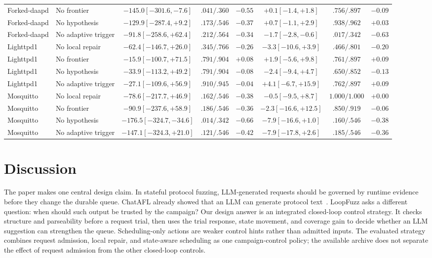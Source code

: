 \documentclass[final,5p,times,number]{elsarticle}
\begin{document}
\begin{table}[!t]
{{\begin{tabular}{l l c c c c c c}
Forked-daapd & No frontier & $-145.0 [-301.6,-7.6]$ & $.041/.360$ & $-0.55$ & $+0.1 [-1.4,+1.8]$ & $.756/.897$ & $-0.09$ \\
Forked-daapd & No hypothesis & $-129.9 [-287.4,+9.2]$ & $.173/.546$ & $-0.37$ & $+0.7 [-1.1,+2.9]$ & $.938/.962$ & $+0.03$ \\
Forked-daapd & No adaptive trigger & $-91.8 [-258.6,+62.4]$ & $.212/.564$ & $-0.34$ & $-1.7 [-2.8,-0.6]$ & $.017/.342$ & $-0.63$ \\
Lighttpd1 & No local repair & $-62.4 [-146.7,+26.0]$ & $.345/.766$ & $-0.26$ & $-3.3 [-10.6,+3.9]$ & $.466/.801$ & $-0.20$ \\
Lighttpd1 & No frontier & $-15.9 [-100.7,+71.5]$ & $.791/.904$ & $+0.08$ & $+1.9 [-5.6,+9.8]$ & $.761/.897$ & $+0.09$ \\
Lighttpd1 & No hypothesis & $-33.9 [-113.2,+49.2]$ & $.791/.904$ & $-0.08$ & $-2.4 [-9.4,+4.7]$ & $.650/.852$ & $-0.13$ \\
Lighttpd1 & No adaptive trigger & $-27.1 [-109.6,+56.9]$ & $.910/.945$ & $-0.04$ & $+4.1 [-6.7,+15.9]$ & $.762/.897$ & $+0.09$ \\
Mosquitto & No local repair & $-78.6 [-217.7,+46.9]$ & $.162/.546$ & $-0.38$ & $-0.5 [-9.5,+8.7]$ & $1.000/1.000$ & $+0.00$ \\
Mosquitto & No frontier & $-90.9 [-237.6,+58.9]$ & $.186/.546$ & $-0.36$ & $-2.3 [-16.6,+12.5]$ & $.850/.919$ & $-0.06$ \\
Mosquitto & No hypothesis & $-176.5 [-324.7,-34.6]$ & $.014/.342$ & $-0.66$ & $-7.9 [-16.6,+1.0]$ & $.160/.546$ & $-0.38$ \\
Mosquitto & No adaptive trigger & $-147.1 [-324.3,+21.0]$ & $.121/.546$ & $-0.42$ & $-7.9 [-17.8,+2.6]$ & $.185/.546$ & $-0.36$ \\
\bottomrule
\end{tabular}}
}
\end{table}

\section{Discussion}

The paper makes one central design claim. In stateful protocol fuzzing, LLM-generated requests should be governed by runtime evidence before they change the durable queue. ChatAFL already showed that an LLM can generate protocol text~\cite{chatafl}. LoopFuzz asks a different question: when should such output be trusted by the campaign? Our design answer is an integrated closed-loop control strategy. It checks structure and parseability before a request trial, then uses the trial response, state movement, and coverage gain to decide whether an LLM suggestion can strengthen the queue. Scheduling-only actions are weaker control hints rather than admitted inputs. The evaluated strategy combines request admission, local repair, and state-aware scheduling as one campaign-control policy; the available archive does not separate the effect of request admission from the other closed-loop controls.
\end{document}
